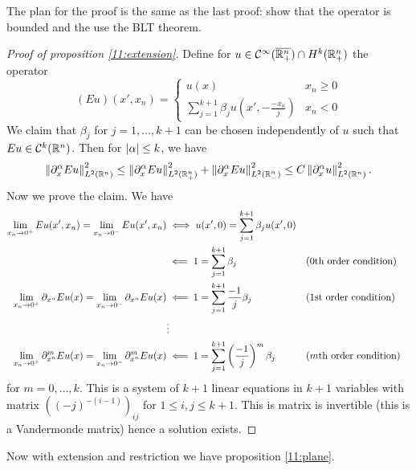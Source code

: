 The plan for the proof is the same as the last proof: show that the operator is bounded and the use the BLT theorem.

\begin{proof}[Proof of proposition \ref{11:extension}]
  Define for $u \in \mathcal{C}^\infty(\overline{\mathbb{R}_+^n}) \cap H^k(\mathbb{R}_+^n)$ the operator
  \begin{equation*}
    (Eu)(x',x_n)=
      \begin{cases}
	u(x) & x_n \geq 0 \\
	\sum_{j=1}^{k+1} \beta_j u\left( x',-\frac{-x_n}j \right) & x_n < 0
      \end{cases}
  \end{equation*}
  We claim that $\beta_j$ for $j=1,\ldots,k+1$ can be chosen independently of $u$ such that $Eu \in \mathcal{C}^k(\mathbb{R}^n)$.
  Then for $\left\lvert \alpha \right\rvert\leq k$, we have
  \[ \left\lVert \partial_x^\alpha Eu \right\rVert_{L^2(\mathbb{R}^n)}^2 \leq \left\lVert \partial_x^\alpha Eu \right\rVert_{L^2(\mathbb{R}_+^n)}^2 + \left\lVert \partial_x^\alpha Eu \right\rVert_{L^2(\mathbb{R}_-^n)}^2 \leq C\left\lVert \partial_x^\alpha u \right\rVert_{L^2(\mathbb{R}^n)}^2. \]
  Now we prove the claim.
  We have
  \begin{align*}
    \lim_{x_n\to0^+}Eu(x',x_n) = \lim_{x_n\to0^-}Eu(x',x_n) &\iff u(x',0) = \sum_{j=1}^{k+1} \beta_j u(x',0) \\
    &\impliedby 1 = \sum_{j=1}^{k+1} \beta_j && \text{(0th order condition)} \\
    \lim_{x_n\to0^+}\partial_{x^n}Eu(x) = \lim_{x_n\to0^-}\partial_{x^n}Eu(x) &\impliedby 1 = \sum_{j=1}^{k+1} \frac{-1}{j} \beta_j && \text{(1st order condition)} \\
    &\vdots \\
    \lim_{x_n\to0^+}\partial_{x^n}^mEu(x) = \lim_{x_n\to0^-}\partial_{x^n}^mEu(x) &\impliedby 1 = \sum_{j=1}^{k+1} \left(\frac{-1}{j}\right)^m \beta_j && \text{($m$th order condition)}
  \end{align*}
  for $m=0,\ldots,k$.
  This is a system of $k+1$ linear equations in $k+1$ variables with matrix $\left( (-j)^{-(i-1)} \right)_{ij}$ for $1\leq i,j \leq k+1$.
  This is matrix is invertible (this is a Vandermonde matrix) hence a solution exists.
\end{proof}

Now with extension and restriction we have proposition \ref{11:plane}.


